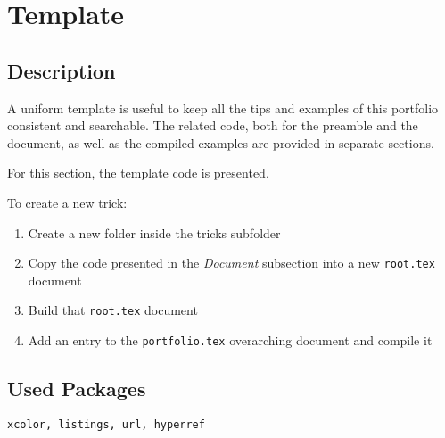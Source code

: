 \documentclass{article}
\begin{document}
	
	\section*{Template}
	
	\subsection*{Description}
	A uniform template is useful to keep all the tips and examples of this portfolio consistent and searchable. The related code, both for the preamble and the document, as well as the compiled examples are provided in separate sections.
	
	For this section, the template code is presented.
	
	To create a new trick:
	\begin{enumerate}
		\item Create a new folder inside the tricks subfolder
		\item Copy the code presented in the \textit{Document} subsection into a new \texttt{root.tex} document
		\item Build that \texttt{root.tex} document
		\item Add an entry to the \texttt{portfolio.tex} overarching document and compile it
	\end{enumerate}
	
	\subsection*{Used Packages}
	\verb|xcolor, listings, url, hyperref|
	
\end{document}

